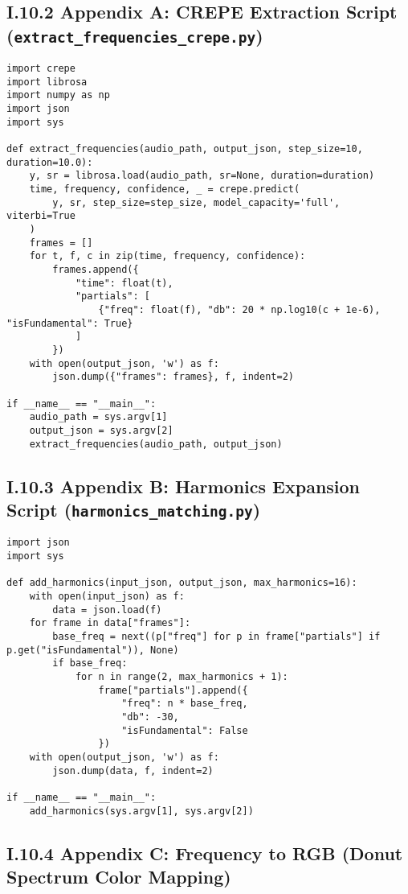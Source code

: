 \subsection*{I.10.2 Appendix A: CREPE Extraction Script (\texttt{extract\_frequencies\_crepe.py})}

\begin{verbatim}
import crepe
import librosa
import numpy as np
import json
import sys

def extract_frequencies(audio_path, output_json, step_size=10, duration=10.0):
    y, sr = librosa.load(audio_path, sr=None, duration=duration)
    time, frequency, confidence, _ = crepe.predict(
        y, sr, step_size=step_size, model_capacity='full', viterbi=True
    )
    frames = []
    for t, f, c in zip(time, frequency, confidence):
        frames.append({
            "time": float(t),
            "partials": [
                {"freq": float(f), "db": 20 * np.log10(c + 1e-6), "isFundamental": True}
            ]
        })
    with open(output_json, 'w') as f:
        json.dump({"frames": frames}, f, indent=2)

if __name__ == "__main__":
    audio_path = sys.argv[1]
    output_json = sys.argv[2]
    extract_frequencies(audio_path, output_json)
\end{verbatim}

\subsection*{I.10.3 Appendix B: Harmonics Expansion Script (\texttt{harmonics\_matching.py})}

\begin{verbatim}
import json
import sys

def add_harmonics(input_json, output_json, max_harmonics=16):
    with open(input_json) as f:
        data = json.load(f)
    for frame in data["frames"]:
        base_freq = next((p["freq"] for p in frame["partials"] if p.get("isFundamental")), None)
        if base_freq:
            for n in range(2, max_harmonics + 1):
                frame["partials"].append({
                    "freq": n * base_freq,
                    "db": -30,
                    "isFundamental": False
                })
    with open(output_json, 'w') as f:
        json.dump(data, f, indent=2)

if __name__ == "__main__":
    add_harmonics(sys.argv[1], sys.argv[2])
\end{verbatim}

\subsection*{I.10.4 Appendix C: Frequency to RGB (Donut Spectrum Color Mapping)}

